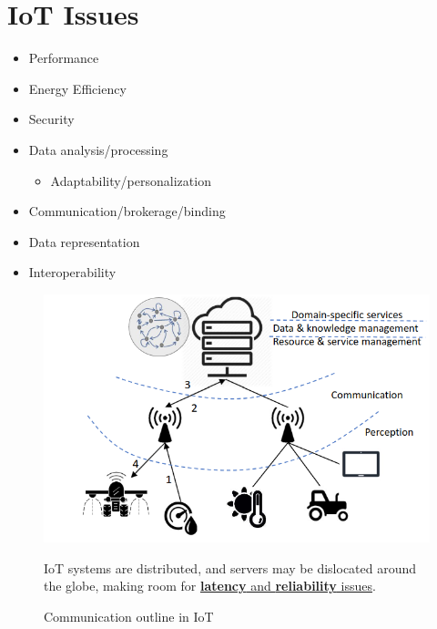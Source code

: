 \section{IoT Issues}
\begin{paracol}{2}
   
   \begin{itemize}
      \item Performance
   \item Energy Efficiency
   \item Security
   \item Data analysis/processing
   \begin{itemize}
      \item Adaptability/personalization
   \end{itemize}
\end{itemize}
\switchcolumn

\begin{itemize}
   \item Communication/brokerage/binding
   \item Data representation
   \item Interoperability
   \end{itemize}
\end{paracol}

\begin{figure}[htbp]
   \centering
   \includegraphics{images/iot_communication.png}
   \caption{Communication outline in IoT}
   IoT systems are distributed, and servers may be dislocated around the globe, making room for \ul{\textbf{latency} and \textbf{reliability} issues}.
   \label{fig:iot_communication}
\end{figure}

